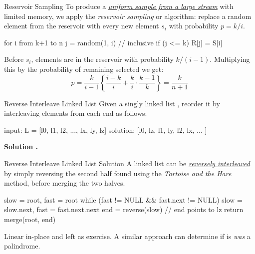 \documentclass{cognito}
\begin{document}
\begin{note}{Reservoir Sampling}
	To produce a \hyperref[note:Uniform Stream Sampling]{\it uniform sample from a large stream} with limited
	memory, we apply the {\it reservoir sampling} or  algorithm: replace a random element from the
	reservoir with every new element $s_i$ with probability $p = k/i$.
	\begin{largecode}
 for i from k+1 to n
 	j = random(1, i)  // inclusive
	if (j <= k) R[j] = S[i]
	\end{largecode}
 Before $s_i$, elements are in the reservoir with probability $k/(i-1)$.
 Multiplying this by the probability of remaining selected we get:
 $$
 	p = \frac{k}{i-1}\left\{\frac{i-k}{i} + \frac{k}{i} \cdot \frac{k-1}{k} \right\} = \frac{k}{n+1}
 $$
	\vspace{-10pt}
\end{note}

\begin{note}{Reverse Interleave Linked List}
	Given a singly linked list , reorder it 
	by interleaving elements from each end as follows:
	\begin{largecode}
 input: L = [l0, l1, l2, ..., lx, ly, lz]
 solution: [l0, lz, l1, ly, l2, lx, ... ]
	\end{largecode}
	\bf Solution \hyperref[note:Reverse Interleave Linked List Solution]{\solutionref}.
\end{note}

\begin{note}{Reverse Interleave Linked List Solution}
	A linked list  can be \hyperref[note:Reverse Interleave Linked List]{\it reversely interleaved}
	by simply reversing the second half found using the {\it Tortoise and the Hare} method, before
	merging the two halves.
	\begin{largecode}
 slow = root, fast = root
 while (fast != NULL && fast.next != NULL)
 	slow = slow.next, fast = fast.next.next
 end = reverse(slow)  // end points to lz
 return merge(root, end)
	\end{largecode}
	\begin{remark} Linear in-place  and  left as exercise.
		A similar approach can determine if  is \emph{was} a palindrome.
	\end{remark}
	\vspace{-5pt}
\end{note}
\end{document}
